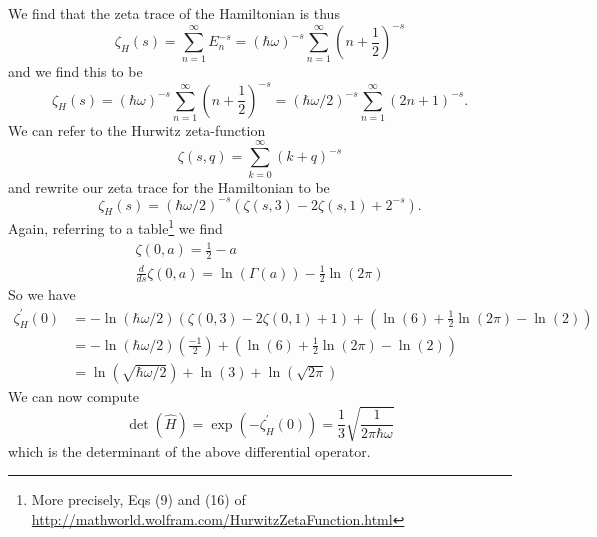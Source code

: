 We find that the zeta trace of the Hamiltonian is thus
\begin{equation}
\zeta_{H}(s) = \sum^{\infty}_{n=1}E_{n}^{-s} = (\hbar\omega)^{-s}\sum^{\infty}_{n=1}(n+\frac{1}{2})^{-s}
\end{equation}
and we find this to be
\begin{equation}
\zeta_{H}(s) = (\hbar\omega)^{-s}\sum^{\infty}_{n=1}(n+\frac{1}{2})^{-s} = (\hbar\omega/2)^{-s}\sum^{\infty}_{n=1}(2n+1)^{-s}.
\end{equation}
We can refer to the Hurwitz zeta-function
\begin{equation}
\zeta(s,q) = \sum^{\infty}_{k=0}(k+q)^{-s}
\end{equation}
and rewrite our zeta trace for the Hamiltonian to be
\begin{equation}
\zeta_{H}(s) = (\hbar\omega/2)^{-s}\left(\zeta(s,3)-2\zeta(s,1)+2^{-s}\right).
\end{equation}
Again, referring to a table\footnote{More precisely, Eqs (9) and (16) of \url{http://mathworld.wolfram.com/HurwitzZetaFunction.html}} we find
\begin{equation}
\begin{array}{c}
\zeta(0,a)=\frac{1}{2}-a\\
\frac{d}{ds}\zeta(0,a) = \ln(\Gamma(a))-\frac{1}{2}\ln(2\pi)
\end{array}
\end{equation}
So we have
\begin{equation}
\begin{split}
\zeta_{H}^{\prime}(0) & =  -\ln(\hbar\omega/2)\left(\zeta(0,3)-2\zeta(0,1)+1\right) + \left(\ln(6)+\frac{1}{2}\ln(2\pi)-\ln(2)\right) \\
& =  -\ln(\hbar\omega/2)\left(\frac{-1}{2}\right) + \left(\ln(6)+\frac{1}{2}\ln(2\pi)-\ln(2)\right) \\
& =  \ln(\sqrt{\hbar\omega/2}) + \ln(3) + \ln(\sqrt{2\pi})
\end{split}
\end{equation}
We can now compute
\begin{equation}
\det{(\hat{H})} =  \exp{(-\zeta_{H}^{\prime}(0))} =  \frac{1}{3}\sqrt{\frac{1}{2\pi\hbar\omega}}
\end{equation}
which is the determinant of the above differential operator.
